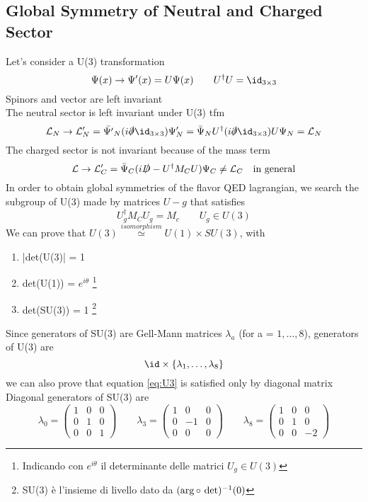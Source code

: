 \documentclass[TheoreticalPhy_ModB.tex]{subfiles}
\begin{document}
\subsection{Global Symmetry of Neutral and Charged Sector}
Let's consider a U(3) transformation
\[
\Psi(x) \to \Psi'(x) = U\Psi(x)
\qquad
U^{\dagger}U = \id_{3 \times 3}
\]
Spinors and vector are left invariant\\
The neutral sector is left invariant under U(3) tfm
\[
\mathL_N \to \mathL'_N = \bar{\Psi'}_N (i \slashed \partial \id_{3 \times 3})\Psi'_N =
	\bar{\Psi}_N U^{\dagger}(i \slashed \partial \id_{3 \times 3})U \Psi_N = \mathL_N
\]
The charged sector is not invariant because of the mass term
\[
\mathcal{L} \to \mathcal{L}'_C = \bar{\Psi}_C ( i \slashed D - U^{\dagger}M_C U)\Psi_C \ne \mathcal{L}_C
\quad \textup{in general}
\]
In order to obtain global symmetries of the flavor QED lagrangian, we search the subgroup of U(3) made by matrices $U-g$ that satisfies
\begin{equation}
U^{\dagger}_g M_C U_g = M_c
\qquad
U_g \in U(3)
\label{eq:U3}
\end{equation}
We can prove that $U(3) \overset{isomorphism}{\simeq} U(1) \times SU(3)$, with
\begin{enumerate}
\item |det(U(3)| = 1
\item det(U(1)) = $e^{i\theta}$ \footnote{Indicando con $e^{i\theta}$ il determinante delle matrici $U_g \in U(3)$}
\item det(SU(3)) = 1 \footnote{SU(3) è l'insieme di livello dato da $(\arg \circ \textup{ det})^{-1}(0)$}
\end{enumerate}
Since generators of SU(3) are Gell-Mann matrices $\lambda_a$ (for a = $1, \dots, 8$), generators of U(3) are
\[
\id \times \{ \lambda_1, \dots, \lambda_8 \}
\]
we can also prove that equation \ref{eq:U3} is satisfied only by diagonal matrix\\
Diagonal generators of SU(3) are
\[
\lambda_0 =
\begin{pmatrix}
1	& 0 	& 0 \\
0	& 1	& 0 \\
0	& 0	& 1
\end{pmatrix}
\qquad
\lambda_3 =
\begin{pmatrix}
1	& 0 	& 0 \\
0	& -1	& 0 \\
0	& 0	& 0
\end{pmatrix}
\qquad
\lambda_8 =
\begin{pmatrix}
1	& 0 	& 0 \\
0	& 1	& 0 \\
0	& 0	& -2
\end{pmatrix}
\]
\end{document}
